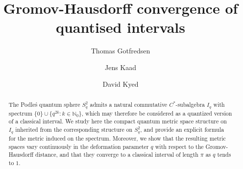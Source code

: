 \documentclass[11pt, reqno, a4paper, final]{amsart}
\title{Gromov-Hausdorff convergence of quantised intervals}
\author{Thomas Gotfredsen}
\author{Jens Kaad}
\author{David Kyed}
\theoremstyle{plain}
\theoremstyle{definition}
\newcommand{\NN}{{\mathbb N}}
\begin{document}
\begin{abstract}
The Podle\'s quantum sphere $S^2_q$ admits a natural commutative $C^*$-subalgebra $I_q$  with spectrum $\{0\} \cup \{q^{2k}: k\in \NN_0\}$, which may therefore be considered as a quantized version of a classical interval. We study here the compact  quantum metric space  structure  on $I_q$ inherited from the corresponding structure on $S^2_q$, and provide an explicit formula for the metric induced on the spectrum. Moreover, we show that the resulting metric spaces vary continuously in the deformation parameter $q$ with respect to  the Gromov-Hausdorff distance, and that they converge to a classical interval of length $\pi$ as $q$ tends to $1$.
\end{abstract}


\maketitle
\end{document}
